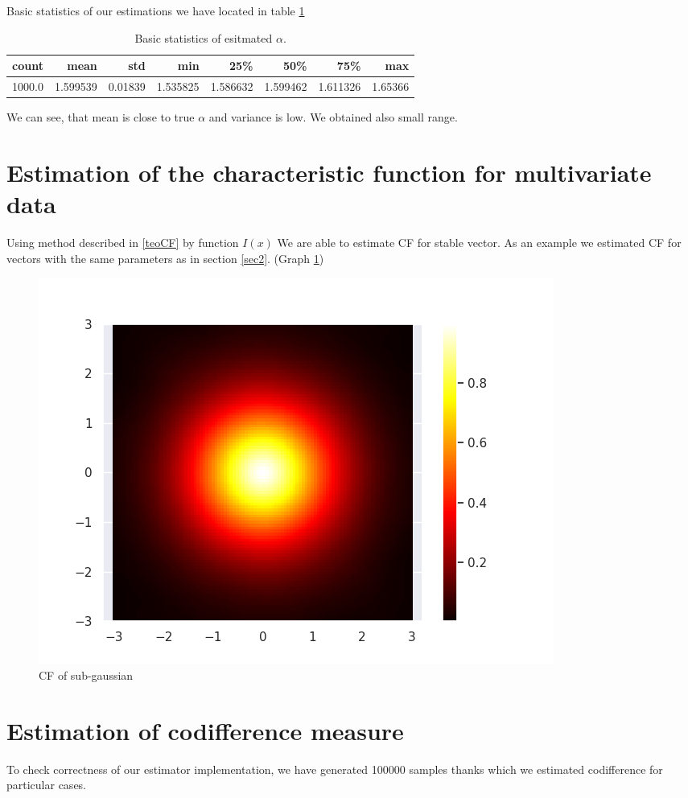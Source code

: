 \documentclass{article}
\begin{document}
	Basic statistics of our estimations we have located in table \ref{tab2}
	
	\begin{table}[H]
		\centering
		\begin{tabular}{rrrrrrrr}
			\hline
			count &      mean &      std &       min &       25\% &       50\% &       75\% &      max \\
			\hline
			1000.0 &  1.599539 &  0.01839 &  1.535825 &  1.586632 &  1.599462 &  1.611326 &  1.65366 \\
			\hline
		\end{tabular}
		\caption{Basic statistics of esitmated $\alpha$.}\label{tab2}
	\end{table}
	
	We can see, that mean is close to true $\alpha$ and variance is low. We obtained also small range.
	
	\section{Estimation of the characteristic function for multivariate data}
	Using method described in \ref{teoCF} by function $I(x)$ We are able to estimate CF for stable vector.
	As an example we estimated CF for vectors with the same parameters as in section \ref{sec2}. (Graph \ref{12})
	\begin{figure}[H]
		\centering
		\includegraphics[width=1\linewidth]{images/ex_4_cf_sub_gaussian_SaS}
		\caption{CF of sub-gaussian}\label{12}
	\end{figure}
	
	\section{Estimation of codifference measure}
	To check correctness of our estimator implementation, we have generated 100000 samples thanks which we estimated codifference for particular cases.
	
\end{document}
